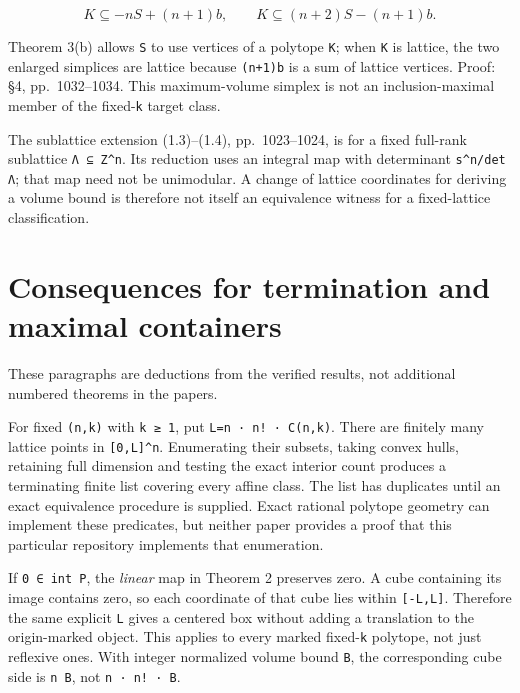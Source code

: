 \documentclass[11pt,a4paper,oneside]{report}
\begin{document}
\[
K\subseteq -nS+(n+1)b,
\qquad K\subseteq (n+2)S-(n+1)b.
\]

Theorem 3(b) allows \texttt{S} to use vertices of a polytope \texttt{K};
when \texttt{K} is lattice, the two enlarged simplices are lattice
because \texttt{(\allowbreak{}n+1)\allowbreak{}b} is a sum of lattice
vertices. Proof: §4, pp.~1032--1034. This maximum-volume simplex is not
an inclusion-maximal member of the fixed-\texttt{k} target class.

The sublattice extension (1.3)--(1.4), pp.~1023--1024, is for a fixed
full-rank sublattice \texttt{Λ ⊆ Z\textasciicircum{}n}. Its reduction
uses an integral map with determinant
\texttt{s\textasciicircum{}n/\allowbreak{}det Λ}; that map need not be
unimodular. A change of lattice coordinates for deriving a volume bound
is therefore not itself an equivalence witness for a fixed-lattice
classification.

\section{Consequences for termination and maximal
containers}\label{finiteness-and-box-reduction--consequences-for-termination-and-maximal-containers}

These paragraphs are deductions from the verified results, not
additional numbered theorems in the papers.

For fixed \texttt{(\allowbreak{}n,\allowbreak{}k)} with \texttt{k ≥ 1},
put \texttt{L=\allowbreak{}n · n! · C(\allowbreak{}n,\allowbreak{}k)}.
There are finitely many lattice points in
\texttt{[\allowbreak{}0,\allowbreak{}L]\allowbreak{}\textasciicircum{}n}.
Enumerating their subsets, taking convex hulls, retaining full dimension
and testing the exact interior count produces a terminating finite list
covering every affine class. The list has duplicates until an exact
equivalence procedure is supplied. Exact rational polytope geometry can
implement these predicates, but neither paper provides a proof that this
particular repository implements that enumeration.

If \texttt{0 ∈ int P}, the \emph{linear} map in Theorem 2 preserves
zero. A cube containing its image contains zero, so each coordinate of
that cube lies within
\texttt{[\allowbreak{}-\allowbreak{}L,\allowbreak{}L]}. Therefore the
same explicit \texttt{L} gives a centered box without adding a
translation to the origin-marked object. This applies to every marked
fixed-\texttt{k} polytope, not just reflexive ones. With integer
normalized volume bound \texttt{B}, the corresponding cube side is
\texttt{n B}, not \texttt{n · n! · B}.
\end{document}
